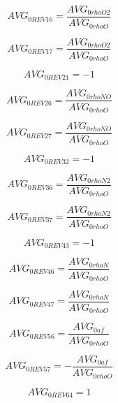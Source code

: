 \documentclass{article}
\begin{document}
\begin{dmath}AVG_{0 REV 16} = \frac{AVG_{0 rhoO2}}{AVG_{0 rhoO}}\end{dmath}

\begin{dmath}AVG_{0 REV 17} = \frac{AVG_{0 rhoO2}}{AVG_{0 rhoO}}\end{dmath}

\begin{dmath}AVG_{0 REV 21} = -1\end{dmath}

\begin{dmath}AVG_{0 REV 26} = \frac{AVG_{0 rhoNO}}{AVG_{0 rhoO}}\end{dmath}

\begin{dmath}AVG_{0 REV 27} = \frac{AVG_{0 rhoNO}}{AVG_{0 rhoO}}\end{dmath}

\begin{dmath}AVG_{0 REV 32} = -1\end{dmath}

\begin{dmath}AVG_{0 REV 36} = \frac{AVG_{0 rhoN2}}{AVG_{0 rhoO}}\end{dmath}

\begin{dmath}AVG_{0 REV 37} = \frac{AVG_{0 rhoN2}}{AVG_{0 rhoO}}\end{dmath}

\begin{dmath}AVG_{0 REV 43} = -1\end{dmath}

\begin{dmath}AVG_{0 REV 46} = \frac{AVG_{0 rhoN}}{AVG_{0 rhoO}}\end{dmath}

\begin{dmath}AVG_{0 REV 47} = \frac{AVG_{0 rhoN}}{AVG_{0 rhoO}}\end{dmath}

\begin{dmath}AVG_{0 REV 56} = \frac{AVG_{0 af}}{AVG_{0 rhoO}}\end{dmath}

\begin{dmath}AVG_{0 REV 57} = - \frac{AVG_{0 af}}{AVG_{0 rhoO}}\end{dmath}

\begin{dmath}AVG_{0 REV 64} = 1\end{dmath}
\end{document}
